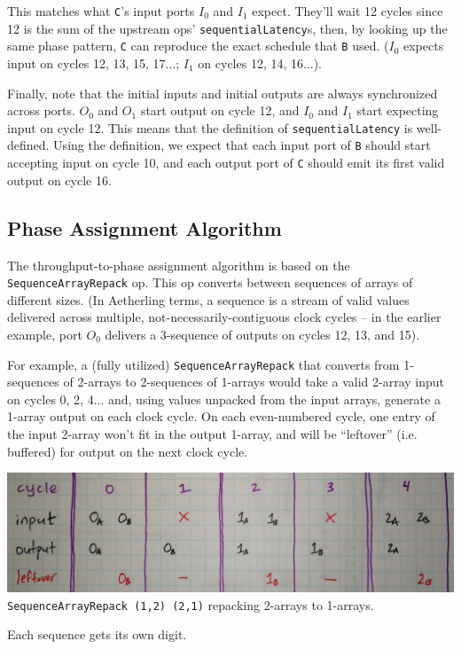 \documentclass[12pt]{article}
\begin{document}
This matches what \texttt{C}'s input ports $I_0$ and $I_1$
expect. They'll wait 12 cycles since 12 is the sum of the upstream
ops' \texttt{sequentialLatency}s, then, by looking up the same phase
pattern, \texttt{C} can reproduce the exact schedule that \texttt{B}
used. ($I_0$ expects input on cycles 12, 13, 15, 17...; $I_1$ on
cycles 12, 14, 16...).

Finally, note that the initial inputs and initial outputs are always
synchronized across ports. $O_0$ and $O_1$ start output on cycle 12,
and $I_0$ and $I_1$ start expecting input on cycle 12. This means that
the definition of \texttt{sequentialLatency} is well-defined. Using
the definition, we expect that each input port of \texttt{B} should
start accepting input on cycle 10, and each output port of \texttt{C}
should emit its first valid output on cycle 16.

\subsection{Phase Assignment Algorithm}

The throughput-to-phase assignment algorithm is based on the
\texttt{SequenceArrayRepack} op. This op converts between
sequences of arrays of different sizes. (In Aetherling terms, a
sequence is a stream of valid values delivered across multiple,
not-necessarily-contiguous clock cycles -- in the earlier
example, port $O_0$ delivers a 3-sequence of outputs on cycles
12, 13, and 15).

For example, a (fully utilized) \texttt{SequenceArrayRepack} that
converts from 1-sequences of 2-arrays to 2-sequences of 1-arrays would
take a valid 2-array input on cycles 0, 2, 4... and, using values
unpacked from the input arrays, generate a 1-array output on each
clock cycle.  On each even-numbered cycle, one entry of the input
2-array won't fit in the output 1-array, and will be ``leftover''
(i.e. buffered) for output on the next clock cycle.

\begin{center}
\includegraphics[width=1.0\linewidth]{Figures/repack.jpg}
\texttt{SequenceArrayRepack (1,2) (2,1)} repacking 2-arrays to 1-arrays.

Each sequence gets its own digit.
\end{center}
\end{document}

